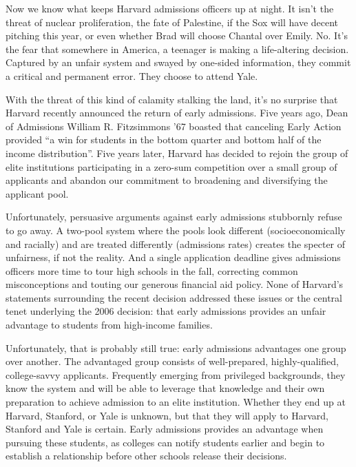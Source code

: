 
Now we know what keeps Harvard admissions officers up at night. It isn't the
threat of nuclear proliferation, the fate of Palestine, if the Sox will have
decent pitching this year, or even whether Brad will choose Chantal over
Emily. No. It's the fear that somewhere in America, a teenager is making a
life-altering decision. Captured by an unfair system and swayed by one-sided
information, they commit a critical and permanent error. They choose to
attend Yale.

With the threat of this kind of calamity stalking the land, it's no surprise
that Harvard recently announced the return of early admissions. Five years
ago, Dean of Admissions William R. Fitzsimmons ’67 boasted that canceling
Early Action provided ``a win for students in the bottom quarter and bottom
half of the income distribution''. Five years later, Harvard has decided to
rejoin the group of elite institutions participating in a zero-sum
competition over a small group of applicants and abandon our commitment to
broadening and diversifying the applicant pool.

Unfortunately, persuasive arguments against early admissions stubbornly
refuse to go away. A two-pool system where the pools look different
(socioeconomically and racially) and are treated differently (admissions
rates) creates the specter of unfairness, if not the reality. And a single
application deadline gives admissions officers more time to tour high schools
in the fall, correcting common misconceptions and touting our generous
financial aid policy. None of Harvard's statements surrounding the recent
decision addressed these issues or the central tenet underlying the 2006
decision: that early admissions provides an unfair advantage to students from
high-income families.

Unfortunately, that is probably still true: early admissions advantages one
group over another. The advantaged group consists of well-prepared,
highly-qualified, college-savvy applicants. Frequently emerging from
privileged backgrounds, they know the system and will be able to leverage
that knowledge and their own preparation to achieve admission to an elite
institution. Whether they end up at Harvard, Stanford, or Yale is unknown,
but that they will apply to Harvard, Stanford and Yale is certain.
Early admissions provides an advantage when pursuing these students, as
colleges can notify students earlier and begin to establish a relationship
before other schools release their decisions.

